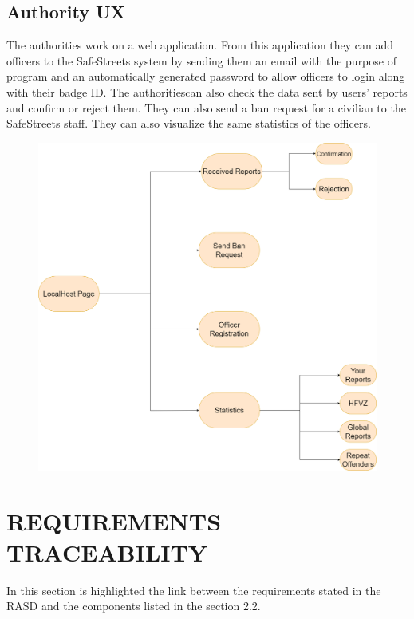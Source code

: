 \documentclass[12pt,a4paper]{article}
\begin{document}
\subsection{Authority UX}
The authorities work on a web application. From this application they can add officers to the SafeStreets system by sending them an email with the purpose of program and an automatically generated password to allow officers to login along with their badge ID. The authoritiescan  also check the data sent by users' reports and confirm or reject them. They can also send a ban request for a civilian to the SafeStreets staff. They can also visualize the same statistics of the officers.
\begin{figure}[H]
		\centering
			\includegraphics[width=0.75\linewidth]{Images/UX/AuthorityUX}
\end{figure}
\newpage
\section{REQUIREMENTS TRACEABILITY}
In this section is highlighted the link between the requirements stated in the RASD and the components listed in the section 2.2.\\\\
\end{document}
